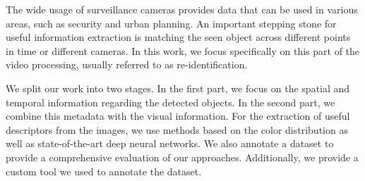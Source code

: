 \documentclass[12pt]{report}
\begin{document}

The wide usage of surveillance cameras provides data that can be used in various areas, such as security and urban planning. An important stepping stone for useful information extraction is matching the seen object across different points in time or different cameras. In this work, we focus specifically on this part of the video processing, usually referred to as re-identification.

We split our work into two stages. In the first part, we focus on the spatial and temporal information regarding the detected objects. In the second part, we combine this metadata with the visual information. For the extraction of useful descriptors from the images, we use methods based on the color distribution as well as state-of-the-art deep neural networks. We also annotate a dataset to provide a comprehensive evaluation of our approaches. Additionally, we provide a custom tool we used to annotate the dataset.
\end{document}
